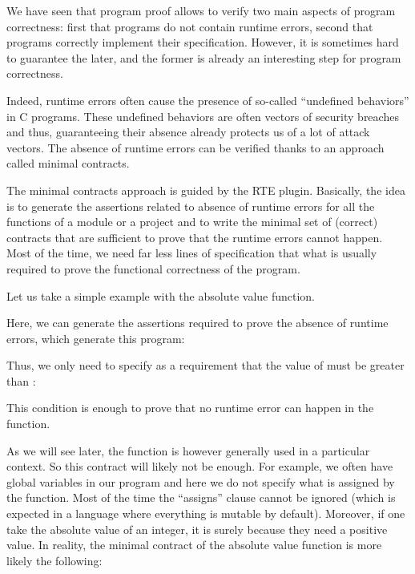 We have seen that program proof allows to verify two main aspects of program
correctness: first that programs do not contain runtime errors, second that
programs correctly implement their specification. However, it is sometimes hard
to guarantee the later, and the former is already an interesting step for
program correctness.

Indeed, runtime errors often cause the presence of so-called ``undefined
behaviors'' in C programs. These undefined behaviors are often vectors of
security breaches and thus, guaranteeing their absence already protects us of a
lot of attack vectors. The absence of runtime errors can be verified thanks to
an approach called minimal contracts.




The minimal contracts approach is guided by the RTE plugin. Basically, the idea
is to generate the assertions related to absence of runtime errors for all the
functions of a module or a project and to write the minimal set of (correct)
contracts that are sufficient to prove that the runtime errors cannot happen.
Most of the time, we need far less lines of specification that what is usually
required to prove the functional correctness of the program.


Let us take a simple example with the absolute value function.




Here, we can generate the assertions required to prove the absence of runtime
errors, which generate this program:




Thus, we only need to specify as a requirement that the value of 
must be greater than :




This condition is enough to prove that no runtime error can happen in the
function.


As we will see later, the function is however generally used in a particular
context. So this contract will likely not be enough. For
example, we often have global variables in our program and here we do not
specify what is assigned by the function. Most of the time the ``assigns''
clause cannot be ignored (which is expected in a language where everything is
mutable by default). Moreover, if one take the absolute value of an integer,
it is surely because they need a positive value. In reality, the minimal
contract of the absolute value function is more likely the following:


